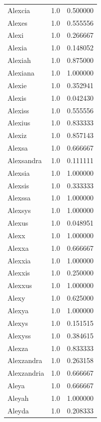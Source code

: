\documentclass[
  letterpaper,
  DIV=11,
  numbers=noendperiod]{scrreprt}
\begin{document}
\begin{tabular}{lrr}
Alexcia         &   1.0 &   0.500000 \\
Alexes          &   1.0 &   0.555556 \\
Alexi           &   1.0 &   0.266667 \\
Alexia          &   1.0 &   0.148052 \\
Alexiah         &   1.0 &   0.875000 \\
Alexiana        &   1.0 &   1.000000 \\
Alexie          &   1.0 &   0.352941 \\
Alexis          &   1.0 &   0.042430 \\
Alexiss         &   1.0 &   0.555556 \\
Alexius         &   1.0 &   0.833333 \\
Alexiz          &   1.0 &   0.857143 \\
Alexsa          &   1.0 &   0.666667 \\
Alexsandra      &   1.0 &   0.111111 \\
Alexsia         &   1.0 &   1.000000 \\
Alexsis         &   1.0 &   0.333333 \\
Alexssa         &   1.0 &   1.000000 \\
Alexsys         &   1.0 &   1.000000 \\
Alexus          &   1.0 &   0.048951 \\
Alexx           &   1.0 &   1.000000 \\
Alexxa          &   1.0 &   0.666667 \\
Alexxia         &   1.0 &   1.000000 \\
Alexxis         &   1.0 &   0.250000 \\
Alexxus         &   1.0 &   1.000000 \\
Alexy           &   1.0 &   0.625000 \\
Alexya          &   1.0 &   1.000000 \\
Alexys          &   1.0 &   0.151515 \\
Alexyss         &   1.0 &   0.384615 \\
Alexza          &   1.0 &   0.833333 \\
Alexzandra      &   1.0 &   0.263158 \\
Alexzandria     &   1.0 &   0.666667 \\
Aleya           &   1.0 &   0.666667 \\
Aleyah          &   1.0 &   1.000000 \\
Aleyda          &   1.0 &   0.208333 \\

\end{tabular}
\end{document}
